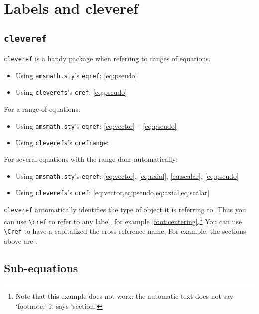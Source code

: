 \section{Labels and cleveref}
\label{sec:labels:and:cleveref}

\subsection{\texorpdfstring{\texttt{cleveref}}{cleveref}}
\label{sec:cleveref}

\texttt{cleveref} is a handy package when referring to ranges of equations. 

\begin{itemize}
	\item Using \texttt{amsmath.sty}'s \texttt{eqref}: \eqref{eq:pseudo}
	\item Using \texttt{cleverefs}'s \texttt{cref}: \cref{eq:pseudo}
\end{itemize}

For a range of equations:
\begin{itemize}
	\item Using \texttt{amsmath.sty}'s \texttt{eqref}: \eqref{eq:vector} -- \eqref{eq:pseudo}
	\item Using \texttt{cleverefs}'s \texttt{crefrange}: 
\end{itemize}

For several equations with the range done automatically:
\begin{itemize}
	\item Using \texttt{amsmath.sty}'s \texttt{eqref}: \eqref{eq:vector}, \eqref{eq:axial}, \eqref{eq:scalar}, \eqref{eq:pseudo}
	\item Using \texttt{cleverefs}'s \texttt{cref}: \cref{eq:vector,eq:pseudo,eq:axial,eq:scalar}
\end{itemize}

\texttt{cleveref} automatically identifies the type of object it is referring to. Thus you can use \verb!\cref! to refer to any label, for example \cref{foot:centering}.\footnote{Note that this example does not work: the automatic text does not say `footnote,' it says `section.'} You can use \verb!\Cref! to have a capitalized the cross reference name. For example: the sections above are .


\subsection{Sub-equations}

